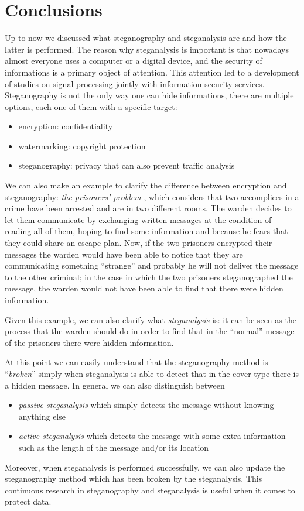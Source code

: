 \documentclass[../../main.tex]{subfiles}
\begin{document}
\section{Conclusions}

Up to now we discussed what steganography and steganalysis are and how the
latter is performed. The reason why steganalysis is important is that nowadays
almost everyone uses a computer or a digital device, and the security of
informations is a primary object of attention. This attention led to a
development of studies on signal processing jointly with information security
services. Steganography is not the only way one can hide informations, there are
multiple options, each one of them with a specific target:

\begin{itemize}[noitemsep]
    \item encryption: confidentiality
    \item watermarking: copyright protection
    \item steganography: privacy that can also prevent traffic analysis
\end{itemize}

We can also make an example to clarify the difference between encryption and
steganography: \emph{the prisoners' problem} \cite{prisoners-problem}, which
considers that two accomplices in a crime have been arrested and are in two
different rooms. The warden decides to let them communicate by exchanging
written messages at the condition of reading all of them, hoping to find some
information and because he fears that they could share an escape plan. Now, if
the two prisoners encrypted their messages the warden would have been able to
notice that they are communicating something ``strange'' and probably he will
not deliver the message to the other criminal; in the case in which the two
prisoners steganographed the message, the warden would not have been able to
find that there were hidden information.

Given this example, we can also clarify what \emph{steganalysis} is: it can be
seen as the process that the warden should do in order to find that in the
``normal'' message of the prisoners there were hidden information.

At this point we can easily understand that the steganography method is
``\emph{broken}'' simply when steganalysis is able to detect that in the cover
type there is a hidden message. In general we can also distinguish between

\begin{itemize}[noitemsep]
    \item \emph{passive steganalysis} which simply detects the message without
          knowing anything else
    \item \emph{active steganalysis} which detects the message with some extra
          information such as the length of the message and/or its location
\end{itemize}

Moreover, when steganalysis is performed successfully, we can also update the
steganography method which has been broken by the steganalysis. This continuous
research in steganography and steganalysis is useful when it comes to protect
data. \cite{review-audio-steganalysis}
\end{document}
